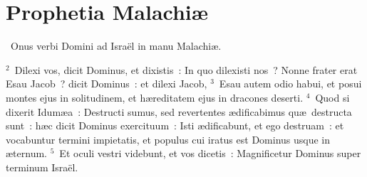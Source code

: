 {\centering \section*{Prophetia Malachiæ}}\thispagestyle{empty}

~\lettrine[lines=10,image=true,loversize=0.05,lraise=-0.03]{O}{}nus verbi Domini ad Isra\"el in manu Malachi\ae .


${}^{2}$~Dilexi vos, dicit Dominus, et dixistis~: In quo dilexisti nos~? Nonne frater erat Esau Jacob~? dicit Dominus~: et dilexi Jacob,
${}^{3}$~Esau autem odio habui, et posui montes ejus in solitudinem, et h\ae reditatem ejus in dracones deserti.
${}^{4}$~Quod si dixerit Idum\ae a~: Destructi sumus, sed revertentes \ae dificabimus qu\ae\ destructa sunt~: h\ae c dicit Dominus exercituum~: Isti \ae dificabunt, et ego destruam~: et vocabuntur termini impietatis, et populus cui iratus est Dominus usque in \ae ternum.
${}^{5}$~Et oculi vestri videbunt, et vos dicetis~: Magnificetur Dominus super terminum Isra\"el.


